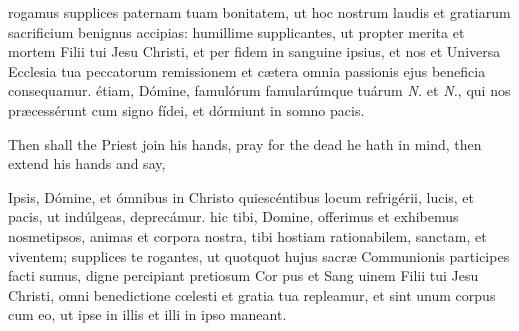 \par
{}
 rogamus supplices paternam tuam bonitatem, ut hoc nostrum laudis et gratiarum sacrificium benignus accipias: humillime supplicantes, ut propter merita et mortem Filii tui Jesu Christi, et per fidem in sanguine ipsius, et nos et Universa Ecclesia tua peccatorum remissionem et cætera omnia passionis ejus beneficia consequamur.
 étiam, Dómine, famulórum famularúmque tuárum \emph{N.} et \emph{N.}, qui nos præcessérunt cum signo fídei, et dórmiunt in somno pacis.
\begin{rubric}
    Then shall the Priest join his hands, pray for the dead he hath in mind, then extend his hands and say,
\end{rubric}\par\noindent
Ipsis, Dómine, et ómnibus in Christo quiescéntibus locum refrigérii, lucis, et pacis, ut indúlgeas, deprecámur.
 hic tibi, Domine, offerimus et exhibemus nosmetipsos, animas et corpora nostra, tibi hostiam rationabilem, sanctam, et viventem; supplices te rogantes, ut quotquot hujus sacræ Communionis participes facti sumus, digne percipiant pretiosum Cor {} pus et Sang {} uinem Filii tui Jesu Christi, omni benedictione cœlesti et gratia tua repleamur, et sint unum corpus cum eo, ut ipse in illis et illi in ipso maneant.

